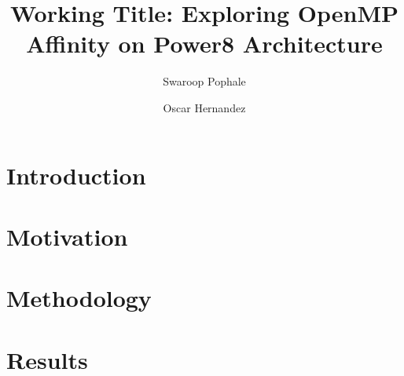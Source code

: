\documentclass{llncs}
\begin{document}
%
\frontmatter          %
%
\pagestyle{headings}  %
\title{Working Title: Exploring OpenMP Affinity on Power8 Architecture }
%
%
\author{Swaroop Pophale \and Oscar Hernandez
}
%
%
\maketitle              %

\begin{abstract}

\end{abstract}

\section{Introduction}
\label{sec:intro}


\section{Motivation}
\label{sec:motivation}


\section{Methodology}
\label{sec:method}

\section{Results}
\label{sec:results}
 
\end{document}
